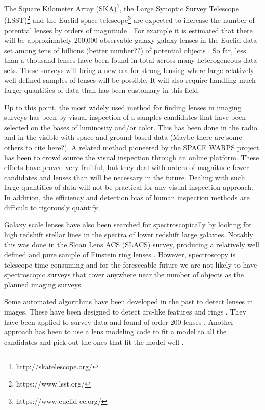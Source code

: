 \documentclass[useAMS,usenatbib]{mnras}
\newcommand{\red}[1]{{\color{red} #1}}
\begin{document}
The Square Kilometer Array (SKA)\footnote{http://skatelescope.org/}, the Large Synoptic Survey Telescope (LSST)\footnote{https://www.lsst.org/} and the Euclid space telescope\footnote{https://www.euclid-ec.org/} are expected to increase the number of potential lenses by orders of magnitude \citep{collett_15,euclidSLWGwhitepaper,2015aska.confE..84M,2010MNRAS.405.2579O}.   For example it is estimated that there will be approximately 200,000 observable galaxy-galaxy lenses in the Euclid data set among \red{tens of billions (better number??)} of potential objects .  So far, less than a thousand lenses have been found in total across many heterogeneous data sets.  These surveys will bring a new era for strong lensing where large relatively well defined samples of lenses will be possible.  It will also require handling much larger quantities of data than has been customary in this field.

Up to this point, the most widely used method for finding lenses in imaging surveys has been by visual inspection of a samples candidates that have been selected on the bases of luminosity and/or color.  This has been done in the radio \citep{2003MNRAS.341...13B} and in the visible with space and ground based data \citep{2008MNRAS.389.1311J,2008ApJS..176...19F,2014MNRAS.439.3392P} \red{(Maybe there are some others to cite here?)}.  A related method pioneered by the SPACE WARPS project \citep{2016MNRAS.455.1171M,2016MNRAS.455.1191M,2015MNRAS.452..502G} has been to crowd source the visual inspection through an online platform.  These efforts have proved very fruitful, but they deal with orders of magnitude fewer candidates and lenses than will be necessary in the future.  Dealing with such large quantities of data will not be practical for any visual inspection approach.  In addition, the efficiency and detection bias of human inspection methods are difficult to rigorously quantify.

Galaxy scale lenses have also been searched for spectroscopically by looking for high redshift stellar lines in the spectra of lower redshift large galaxies.  Notably this was done in the Sloan Lens ACS (SLACS) survey, producing a relatively well defined and pure sample of Einstein ring lenses \citep{2006ApJ...638..703B}.  However, spectroscopy is telescope-time consuming and for the foreseeable future we are not likely to have spectroscopic surveys that cover anywhere near the number of objects as the planned imaging surveys.

Some automated algorithms have been developed in the past to detect lenses in images.  These have been designed to detect arc-like features \citep{2006astro.ph..6757A,2007A&A...472..341S, 2017A&A...597A.135B} and rings \citep{2014ApJ...785..144G,2014A&A...566A..63J}.  They have been applied to survey data and found of order 200 lenses \citep{2007A&A...461..813C,2012ApJ...749...38M,2016A&A...592A..75P}.  Another approach has been to use a lens modeling code to fit a model to all the candidates and pick out the ones that fit the model well \citep{2009ApJ...694..924M,2010A&A...517A..25S,2017arXiv170401585S}.
\end{document}
